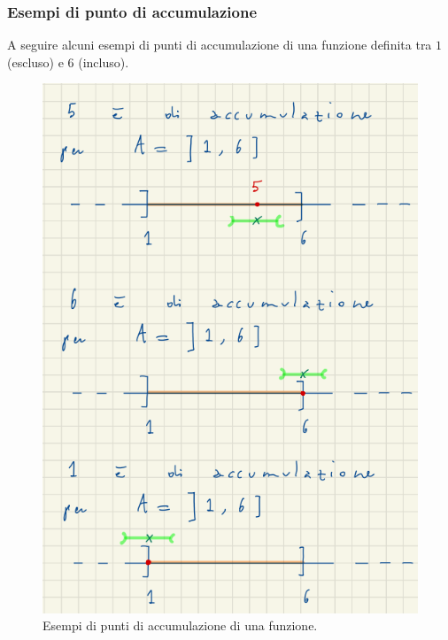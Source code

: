\documentclass[12pt]{article}
\begin{document}
\subsubsection{Esempi di punto di accumulazione}
A seguire alcuni esempi di punti di accumulazione di una funzione definita tra $1$ (escluso) e $6$ (incluso).
\begin{figure}[!htb]
    \centering
    \includegraphics[width=1\textwidth, height=.7\textheight,keepaspectratio]{lezione_7/esempi_punti_accumulazione.png}
    \begin{center}
        \caption{\label{fig:esempi_punti_accumulazione}Esempi di punti di accumulazione di una funzione.}
    \end{center}
\end{figure}
\pagebreak
\end{document}
